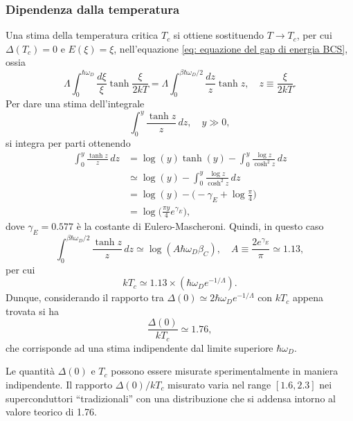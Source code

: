 \subsubsection{Dipendenza dalla temperatura}
Una stima della temperatura critica $T_c$ si ottiene sostituendo $T \to T_c$, per cui $\Delta(T_c) = 0$ e $E(\xi) = \xi$, nell'equazione \eqref{eq: equazione del gap di energia BCS}, ossia
\begin{equation}
    \Lambda\int_0^{\hbar\omega_D}\frac{d\xi}{\xi}\tanh{\frac{\xi}{2kT}} = \Lambda\int_0^{\beta\hbar\omega_D/2}\frac{dz}{z}\tanh{z},\quad z \equiv \frac{\xi}{2kT}.
\end{equation}
Per dare una stima dell'integrale 
\begin{equation}
    \int_0^y\frac{\tanh{z}}{z}\,dz,\quad y \gg 0,
\end{equation}
si integra per parti ottenendo
\begin{equation}
    \begin{split}
        \int_0^y\frac{\tanh{z}}{z}\,dz &= \log{(y)}\tanh{(y)} - \int_0^y\frac{\log{z}}{\cosh^2{z}}\,dz \\
        &\simeq \log{(y)} - \int_0^y\frac{\log{z}}{\cosh^2{z}}\,dz \\
        &= \log{(y)} - \bigg(-\gamma_E + \log{\frac{\pi}{4}}\bigg) \\
        &= \log{\bigg(\frac{\pi y}{4}e^{\gamma_E}\bigg)},
    \end{split}
\end{equation}
dove $\gamma_E = 0.577$ è la costante di Eulero-Mascheroni. Quindi, in questo caso
\begin{equation}
    \int_0^{\beta\hbar\omega_D/2}\frac{\tanh{z}}{z}\,dz \simeq \log{(A\hbar\omega_D\beta_C)},\quad A \equiv \frac{2e^{\gamma_E}}{\pi} \simeq 1.13,
\end{equation}
per cui 
\begin{equation}
    kT_c \simeq 1.13 \times (\hbar\omega_De^{-1/\Lambda}).
\end{equation}
Dunque, considerando il rapporto tra $\Delta(0) \simeq 2\hbar\omega_De^{-1/\Lambda}$ con $kT_c$ appena trovata si ha
\begin{equation}
    \frac{\Delta(0)}{kT_c} \simeq 1.76,
\end{equation}
che corrisponde ad una stima indipendente dal limite superiore $\hbar\omega_D$.
\begin{obs}
    Le quantità $\Delta(0)$ e $T_c$ possono essere misurate sperimentalmente in maniera indipendente. Il rapporto $\Delta(0)/kT_c$ misurato varia nel range $[1.6,2.3]$ nei superconduttori ``tradizionali'' con una distribuzione che si addensa intorno al valore teorico di 1.76.
\end{obs}

